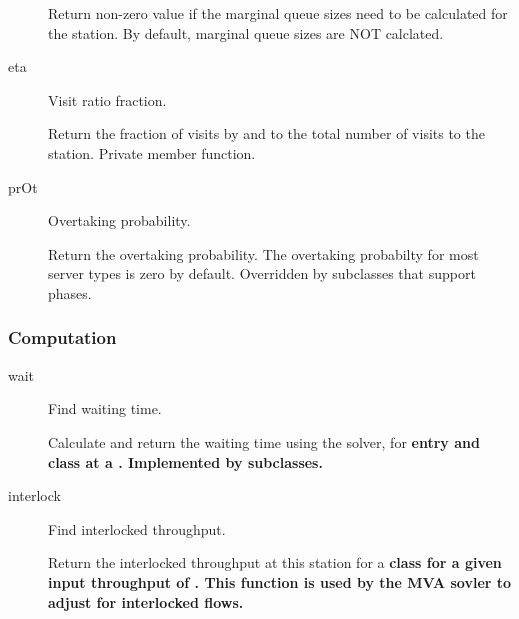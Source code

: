 \begin{description}
  Return non-zero value if the marginal queue sizes need to be
  calculated for the station.  By default, marginal queue sizes are NOT
  calclated. 

  \label{sec:server-eta}
\item[eta] \texonly{---} Visit ratio fraction.\\

  Return the fraction of visits by  and  to the total
  number of visits to the station.  Private member function.

\item[prOt] \texonly{---} Overtaking probability.\\

  Return the overtaking probability.  The overtaking probabilty for most
  server types is zero by default.  Overridden by subclasses that
  support phases.

\end{description}

\subsubsection{Computation}

\begin{description}
\item[wait] \texonly{---} Find waiting time. \\

  Calculate and return the waiting time using the 
  solver,  for \bf{entry}  and \bf{class} 
  at a  .  Implemented by subclasses.

\item[interlock] \texonly{---} Find interlocked throughput.\\

  Return the interlocked throughput at this station for a \bf{class}
   for a given input throughput of .  This function
  is used by the MVA sovler to adjust for interlocked flows.

\end{description}

